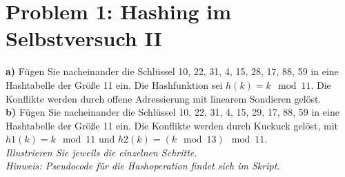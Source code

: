 \section*{{Problem 1: Hashing im Selbstversuch II}}

\noindent
\textbf{a)} Fügen Sie nacheinander die Schlüssel 10, 22, 31, 4, 15, 28, 17, 88, 59 in eine Hashtabelle der Größe 11 ein. Die Hashfunktion sei $h(k) = k \mod 11$. Die Konflikte werden durch offene Adressierung mit linearem Sondieren gelöst.\\

\noindent
\textbf{b)} Fügen Sie nacheinander die Schlüssel 10, 22, 31, 4, 15, 29, 17, 88, 59 in eine Hashtabelle der Größe 11 ein. Die Konflikte werden durch Kuckuck gelöst, mit $h1(k) = k \mod 11$ und $h2(k) = (k \mod 13) \mod 11$.\\

\noindent
\textit{Illustrieren Sie jeweils die einzelnen Schritte.\\
	Hinweis: Pseudocode für die Hashoperation findet sich im Skript.}